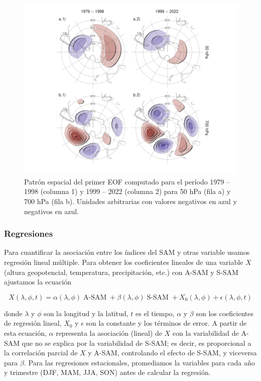 \documentclass[12pt,oneside]{reedthesis}
\begin{document}
\begin{figure}
\includegraphics{figures/30-sam/sam-period-1} \caption{Patrón espacial del primer EOF computado para el período 1979 -- 1998 (columna 1) y 1999 -- 2022 (columna 2) para 50 hPa (fila a) y 700 hPa (fila b).
Unidades arbitrarias con valores negativos en azul y negativos en azul.}\label{fig:sam-period}
\end{figure}

\hypertarget{regresiones}{%
\subsubsection{Regresiones}\label{regresiones}}

Para cuantificar la asociación entre los índices del SAM y otras variable usamos regresión lineal múltiple.
Para obtener los coeficientes lineales de una variable \(X\) (altura geopotencial, temperatura, precipitación, etc.) con A-SAM y S-SAM ajustamos la ecuación

\begin{equation}
X(\lambda, \phi, t) = \alpha(\lambda, \phi) \operatorname{A-SAM} + \beta(\lambda, \phi) \operatorname{S-SAM} + X_0(\lambda, \phi) + \epsilon(\lambda, \phi, t)
\label{eq:multiple-regression-sam}
\end{equation}


donde \(\lambda\) y \(\phi\) son la longitud y la latitud, \(t\) es el tiempo, \(\alpha\) y \(\beta\) son los coeficientes de regresión lineal, \(X_0\) y \(\epsilon\) son la constante y los términos de error.
A partir de esta ecuación, \(\alpha\) representa la asociación (lineal) de \(X\) con la variabilidad de A-SAM que no se explica por la variabilidad de S-SAM; es decir, es proporcional a la correlación parcial de \(X\) y A-SAM, controlando el efecto de S-SAM, y viceversa para \(\beta\).
Para las regresiones estacionales, promediamos la variables para cada año y trimestre (DJF, MAM, JJA, SON) antes de calcular la regresión.
\end{document}
